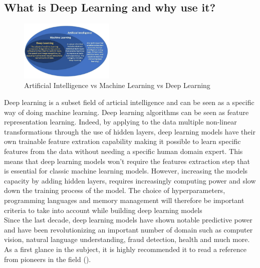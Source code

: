 \documentclass[6pt,letter]{article}\usepackage[]{graphicx}\usepackage[]{color}
\begin{document}
\subsection{What is Deep Learning and why use it?}
\begin{figure}
  \begin{center}
    \includegraphics[width=0.4\textwidth]{figure/deep learning.PNG}
      \end{center}
     \caption{Artificial Intelligence vs Machine Learning vs Deep Learning}
     \label{fig:simule}
\end{figure}

Deep learning is a subset field of articial intelligence and can be seen as a specific way of doing machine learning. Deep learning algorithms can be seen as feature representation learning. Indeed, by applying to the data multiple non-linear transformations through the use of hidden layers, deep learning models have their own trainable feature extration capability making it possible to learn specific features from the data without needing a specific human domain expert. This means that deep learning models won't require the features extraction step that is essential for classic machine learning models. However, increasing the models capacity by adding hidden layers, requires increasingly computing power and slow down the training process of the model. The choice of hyperparameters, programming languages and memory management will therefore be important criteria to take into account while building deep learning models\\
Since the last decade, deep learning models have shown notable predictive power and have been revolutionizing an important number of domain such as computer vision, natural language understanding, fraud detection, health and much more.\\
As a first glance in the subject, it is highly recommended it to read  a reference from pioneers in the field (\cite[Chapter 1]{Goodfellow-et-al-2016}).
\end{document}
